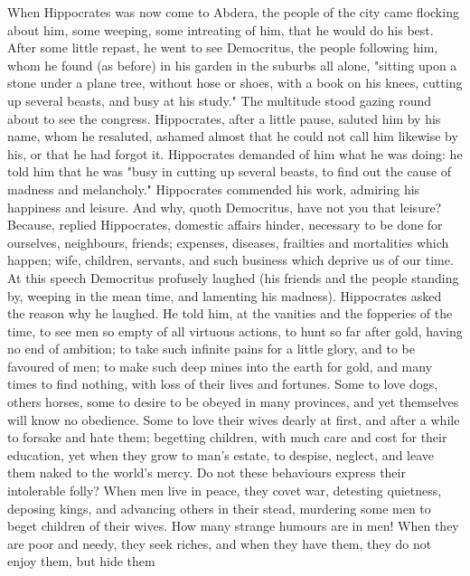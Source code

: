 When Hippocrates was now come to Abdera, the people of the city came flocking
about him, some weeping, some intreating of him, that he would do his best.
After some little repast, he went to see Democritus, the people following him,
whom he found (as before) in his garden in the suburbs all alone,
"sitting upon a stone under a plane tree, without hose or
shoes, with a book on his knees, cutting up several beasts, and busy at his
study." The multitude stood gazing round about to see the congress.
Hippocrates, after a little pause, saluted him by his name, whom he resaluted,
ashamed almost that he could not call him likewise by his, or that he had
forgot it. Hippocrates demanded of him what he was doing: he told him that he
was "busy in cutting up several beasts, to find out the
cause of madness and melancholy." Hippocrates commended his work, admiring his
happiness and leisure. And why, quoth Democritus, have not you that leisure?
Because, replied Hippocrates, domestic affairs hinder, necessary to be done for
ourselves, neighbours, friends; expenses, diseases, frailties and mortalities
which happen; wife, children, servants, and such business which deprive us of
our time. At this speech Democritus profusely laughed (his friends and the
people standing by, weeping in the mean time, and lamenting his madness).
Hippocrates asked the reason why he laughed. He told him, at the vanities and
the fopperies of the time, to see men so empty of all virtuous actions, to hunt
so far after gold, having no end of ambition; to take such infinite pains for a
little glory, and to be favoured of men; to make such deep mines into the earth
for gold, and many times to find nothing, with loss of their lives and
fortunes. Some to love dogs, others horses, some to desire to be obeyed in many
provinces, and yet themselves will know no obedience.
Some to love their wives dearly at first, and after a while
to forsake and hate them; begetting children, with much care and cost for their
education, yet when they grow to man's estate, to despise,
neglect, and leave them naked to the world's mercy. Do not
these behaviours express their intolerable folly? When men live in peace, they
covet war, detesting quietness, deposing kings, and
advancing others in their stead, murdering some men to beget children of their
wives. How many strange humours are in men! When they are poor and needy, they
seek riches, and when they have them, they do not enjoy them, but hide them
